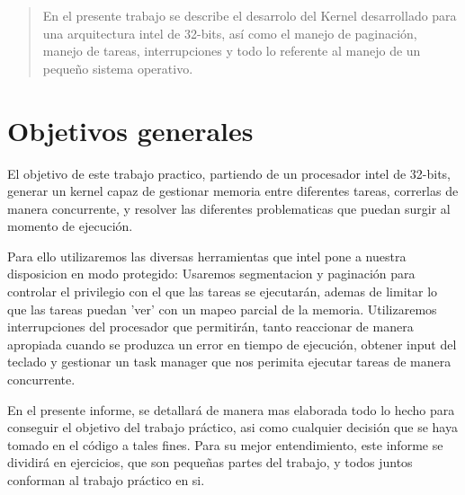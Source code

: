 \documentclass[a4paper]{article}
\begin{document}
\thispagestyle{empty}

\maketitle
\newpage

\thispagestyle{empty}
\vfill
\begin{abstract}
En el presente trabajo se describe el desarrolo del Kernel desarrollado para una arquitectura intel de 32-bits, así como el manejo de paginación, manejo de tareas, interrupciones y todo lo referente al manejo de un pequeño sistema operativo.

\end{abstract}

\thispagestyle{empty}
\vspace{3cm}
\tableofcontents
\newpage

\newpage

\section{Objetivos generales}

El objetivo de este trabajo practico, partiendo de un procesador intel de 32-bits, generar un kernel capaz de gestionar memoria entre diferentes tareas, correrlas de manera concurrente, y resolver las diferentes problematicas que puedan surgir al momento de ejecución.

Para ello utilizaremos las diversas herramientas que intel pone a nuestra disposicion en modo protegido: Usaremos segmentacion y paginación para controlar el privilegio con el que las tareas se ejecutarán, ademas de limitar lo que las tareas puedan 'ver' con un mapeo parcial de la memoria.
Utilizaremos interrupciones del procesador que permitirán, tanto reaccionar de manera apropiada cuando se produzca un error en tiempo de ejecución, obtener input del teclado y gestionar un task manager que nos perimita ejecutar tareas de manera concurrente.

En el presente informe, se detallará de manera mas elaborada todo lo hecho para conseguir el objetivo del trabajo práctico, asi como cualquier decisión que se haya tomado en el código a tales fines. Para su mejor entendimiento, este informe se dividirá en ejercicios, que son pequeñas partes del trabajo, y todos juntos conforman al trabajo práctico en si. 
\end{document}
